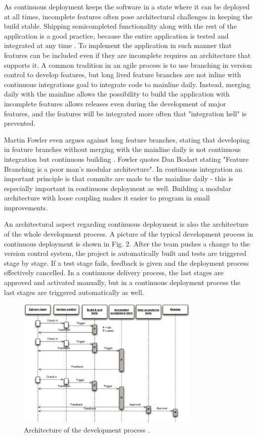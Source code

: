 \documentclass[conference]{IEEEtran}
\begin{document}
As continuous deployment keeps the software in a state where it can be deployed at all times, incomplete features often pose architectural challenges in keeping the build stable. Shipping semicompleted functionality along with the rest of the application is a good practice, because the entire application is tested and integrated at any time \cite{cdbook}. To implement the application in such manner that features can be included even if they are incomplete requires an architecture that supports it. A common tradition in an agile process is to use branching in version control to develop features, but long lived feature branches are not inline with continuous integrations goal to integrate code to mainline daily. Instead, merging daily with the mainline allows the possibility to build the application with incomplete features allows releases even during the development of major features, and the features will be integrated more often that "integration hell" is prevented.

Martin Fowler even argues against long feature branches, stating that developing in feature branches without merging with the mainline daily is not continuous integration but continuous building \cite{mf}. Fowler quotes Dan Bodart stating "Feature Branching is a poor man's modular architecture". In continuous integration an important principle is that commits are made to the mainline daily - this is especially important in continuous deployment as well. Building a modular architecture with loose coupling makes it easier to program in small improvements.

An architectural aspect regarding continuous deployment is also the architecture of the whole development process. A picture of the typical development process in continuous deployment is shown in Fig. 2. After the team pushes a change to the version control system, the project is automatically built and tests are triggered stage by stage. If a test stage fails, feedback is given and the deployment process effectively cancelled. In a continuous delivery process, the last stages are approved and activated manually, but in a continuous deployment process the last stages are triggered automatically as well.

\begin{figure}[!t]
	\centering
	\includegraphics[width=3.5in]{developmentprocess.jpg}
	\caption{Architecture of the development process \cite{cdbook}.}
	\label{fig2}
\end{figure}
\end{document}
